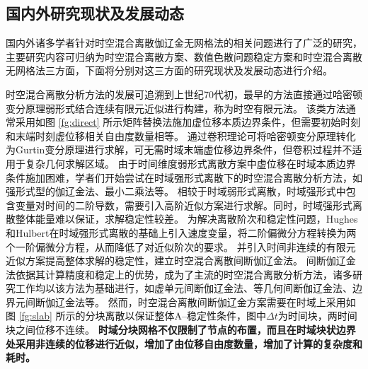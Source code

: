 \subsection{国内外研究现状及发展动态}

国内外诸多学者针对时空混合离散伽辽金无网格法的相关问题进行了广泛的研究，主要研究内容可归纳为时空混合离散方案、数值色散问题稳定方案和时空混合离散无网格法三方面，下面将分别对这三方面的研究现状及发展动态进行介绍。

时空混合离散分析方法的发展可追溯到上世纪70代初\cite{argyris1969a}，最早的方法直接通过哈密顿变分原理弱形式结合连续有限元近似进行构建，称为时空有限元法。
该类方法通常采用如图 \ref{fg:direct} 所示矩阵替换法施加虚位移本质边界条件，但需要初始时刻和末端时刻虚位移相关自由度数量相等。
通过卷积理论可将哈密顿变分原理转化为Gurtin变分原理进行求解，可无需时域末端虚位移边界条件\cite{Peng1992}，但卷积过程并不适用于复杂几何求解区域。
由于时间维度弱形式离散方案中虚位移在时域本质边界条件施加困难，学者们开始尝试在时域强形式离散下的时空混合离散分析方法，如强形式型的伽辽金法\cite{Li2017a}、最小二乘法\cite{epstein2024}等。
相较于时域弱形式离散，时域强形式中包含变量对时间的二阶导数，需要引入高阶近似方案进行求解。同时，时域强形式离散整体能量难以保证，求解稳定性较差。
为解决离散阶次和稳定性问题，Hughes和Hulbert\cite{hughes1988,hulbert1990}在时域强形式离散的基础上引入速度变量，将二阶偏微分方程转换为两个一阶偏微分方程，从而降低了对近似阶次的要求。
并引入时间非连续的有限元近似方案提高整体求解的稳定性，建立时空混合离散间断伽辽金法。
间断伽辽金法依据其计算精度和稳定上的优势，成为了主流的时空混合离散分析方法，诸多研究工作均以该方法为基础进行，如虚单元间断伽辽金法\cite{xu2025}、等几何间断伽辽金法\cite{lejeunes2024}、边界元间断伽辽金法\cite{hoonhout2023}等。
然而，时空混合离散间断伽辽金方案需要在时域上采用如图 \ref{fg:slab} 所示的分块离散以保证整体A--稳定性条件\cite{hughes1988}，图中$\Delta t$为时间块，两时间块之间位移不连续。
\textbf{时域分块网格不仅限制了节点的布置，而且在时域块状边界处采用非连续的位移进行近似，增加了由位移自由度数量，增加了计算的复杂度和耗时。}

